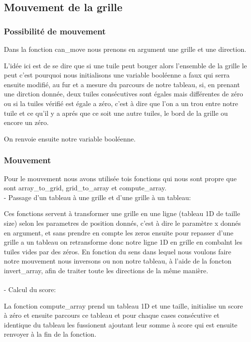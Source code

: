 \documentclass{article}
\begin{document}
\subsection{Mouvement de la grille}
\subsubsection{Possibilité de mouvement}

Dans la fonction can\_move nous prenons en argument une grille et une direction.

L'idée ici est de se dire que si une tuile peut bouger alors l'ensemble de la grille le peut c'est pourquoi nous initialisons une variable booléenne a faux qui serra ensuite modifié, au fur et a mesure du parcours de notre tableau, si, en prenant une dirction donnée, deux tuiles consécutives sont égales mais différentes de zéro ou si la tuiles vérifié est égale a zéro, c'est à dire que l'on a un trou entre notre tuile et ce qu'il y a aprés que ce soit une autre tuiles, le bord de la grille ou encore un zéro.

On renvoie ensuite notre variable booléenne.

\subsubsection{Mouvement}

Pour le mouvement nous avons utilisée tois fonctions qui nous sont propre que sont array\_to\_grid, grid\_to\_array et compute\_array.\\

- Passage d'un tableau à une grille et d'une grille à un tableau:\par
Ces fonctions servent à transformer une grille en une ligne (tableau 1D de taille size) selon les parametres de position donnés, c'est à dire le paramètre x donnés en argument, et sans prendre en compte les zeros ensuite pour repasser d'une grille a un tableau on retransforme donc notre ligne 1D en grille en combalnt les tuiles vides par des zéros. En fonction du sens dans lequel nous voulons faire notre mouvement nous inversons ou non notre tableau, à l'aide de la foncton invert\_array, afin de traiter toute les directions de la même manière.
\\
\\
- Calcul du score:\par
La fonction compute\_array prend un tableau 1D et une taille, initialise un score à zéro et ensuite parcours ce tableau et pour chaque cases consécutive et identique du tableau les fussionent ajoutant leur somme à score qui est ensuite renvoyer à la fin de la fonction.
\\ \\
\end{document}
